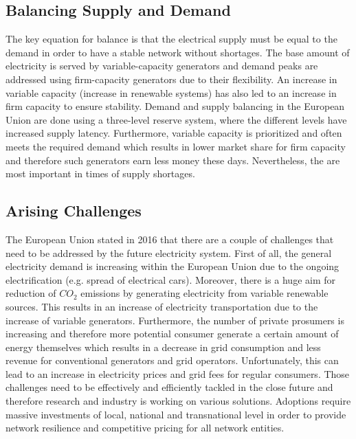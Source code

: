 \documentclass[runningheads]{llncs}
\begin{document}
\subsection{Balancing Supply and Demand}
The key equation for balance is that the electrical supply must be equal to the demand in order to have a stable network without shortages. The base amount of electricity is served by variable-capacity generators and demand peaks are addressed using firm-capacity generators due to their flexibility. An increase in variable capacity (increase in renewable systems) has also led to an increase in firm capacity to ensure stability. Demand and supply balancing in the European Union are done using a three-level reserve system, where the different levels have increased supply latency. Furthermore, variable capacity is prioritized and often meets the required demand which results in lower market share for firm capacity and therefore such generators earn less money these days. Nevertheless, the are most important in times of supply shortages. \cite{eu_energy_market}

\subsection{Arising Challenges}
The European Union \cite{eu_energy_market} stated in 2016 that there are a couple of challenges that need to be addressed by the future electricity system. First of all, the general electricity demand is increasing within the European Union due to the ongoing electrification (e.g. spread of electrical cars). Moreover, there is a huge aim for reduction of $CO_2$ emissions by generating electricity from variable renewable sources. This results in an increase of electricity transportation due to the increase of variable generators.\newline
Furthermore, the number of private prosumers is increasing and therefore more potential consumer generate a certain amount of energy themselves which results in a decrease in grid consumption and less revenue for conventional generators and grid operators. Unfortunately, this can lead to an increase in electricity prices and grid fees for regular consumers. \newline
Those challenges need to be effectively and efficiently tackled in the close future and therefore research and industry is working on various solutions. Adoptions require massive investments of local, national and transnational level in order to provide network resilience and competitive pricing for all network entities.\cite{eu_energy_market}\newline
\end{document}
